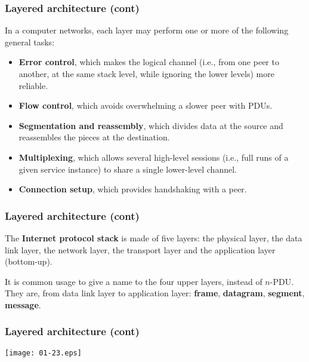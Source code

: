 %
\begin{frame}
\frametitle{Layered architecture (cont)}

In a computer networks, each layer may perform one or more of the
following general tasks:
\begin{itemize}

  \item \textbf{Error control}, which makes the logical channel
  (i.e., from one peer to another, at the same stack level, while
  ignoring the lower levels) more reliable.

  \item \textbf{Flow control}, which avoids overwhelming a slower
  peer with PDUs.

  \item \textbf{Segmentation and reassembly}, which divides data at
  the source and reassembles the pieces at the destination.

  \item \textbf{Multiplexing}, which allows several high-level
  sessions (i.e., full runs of a given service instance) to share a
  single lower-level channel.

  \item \textbf{Connection setup}, which provides handshaking with a
  peer.

\end{itemize}

\end{frame}

%
\begin{frame}
\frametitle{Layered architecture (cont)}

The \textbf{Internet protocol stack} is made of five layers: the
physical layer, the data link layer, the network layer, the transport
layer and the application layer (bottom-up).

\bigskip

It is common usage to give a name to the four upper layers, instead of
\(n\)-PDU. They are, from data link layer to application layer:
\textbf{frame}, \textbf{datagram}, \textbf{segment},
\textbf{message}.

\end{frame}

%
\begin{frame}
\frametitle{Layered architecture (cont)}

\begin{center}
  \texttt{[image: 01-23.eps]}
\end{center}

\end{frame}

